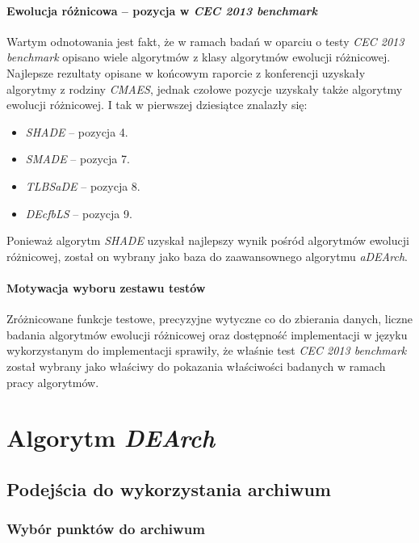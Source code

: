 \documentclass[12pt,a4paper]{report}
\begin{document}
{{{{\subsubsection{Ewolucja różnicowa -- pozycja w \emph{CEC 2013 benchmark}}
\par{
Wartym odnotowania jest fakt, że w ramach badań w oparciu o testy \emph{CEC 2013 benchmark} opisano wiele algorytmów z klasy algorytmów ewolucji różnicowej. Najlepsze rezultaty opisane w końcowym raporcie z konferencji \cite{CEC2013Comp} uzyskały algorytmy z rodziny \emph{CMAES}, jednak czołowe pozycje uzyskały także algorytmy ewolucji różnicowej. I tak w pierwszej dziesiątce znalazły się:
\begin{itemize}
\item \emph{SHADE} \cite{SHADE} -- pozycja 4.
\item \emph{SMADE} \cite{SMADE} -- pozycja 7.
\item \emph{TLBSaDE} \cite{TLBSaDE} -- pozycja 8.
\item \emph{DEcfbLS} \cite{DEcfbLS} -- pozycja 9.
\end{itemize}
}
\par{
Ponieważ algorytm \emph{SHADE} uzyskał najlepszy wynik pośród algorytmów ewolucji różnicowej, został on wybrany jako baza do zaawansownego algorytmu \emph{aDEArch}.
}

\subsubsection{Motywacja wyboru zestawu testów}
\par{
Zróżnicowane funkcje testowe, precyzyjne wytyczne co do zbierania danych, liczne badania algorytmów ewolucji różnicowej oraz dostępność implementacji w języku wykorzystanym do implementacji sprawiły, że właśnie test \emph{CEC 2013 benchmark} został wybrany jako właściwy do pokazania właściwości badanych w ramach pracy algorytmów.
}

\chapter{Algorytm \emph{DEArch}}
\par{

}
\section{Podejścia do wykorzystania archiwum}
\subsection{Wybór punktów do archiwum}
}}}}
\end{document}
